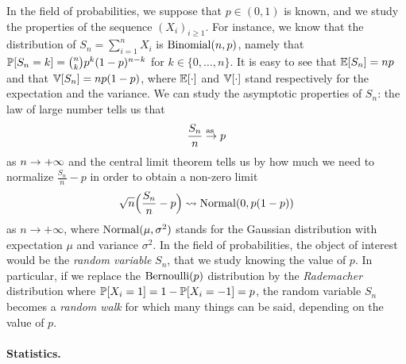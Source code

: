 In the field of probabilities, we suppose that $p \in (0, 1)$ is known, and we study the properties of the sequence $(X_i)_{i \geq 1}$. 
For instance, we know that the distribution of $S_n = \sum_{i=1}^n X_i$ is $\bin(n, p)$,  
namely that $\P[S_n = k] = \binom{n}{k} p^k (1 - p)^{n-k}$ for $k \in \{0, \ldots, n\}$.%
It is easy to see that $\E[S_n] = n p$ and that $\var[S_n] = np (1 - p)$, where $\E[\cdot]$ and $\var[\cdot]$ stand respectively for the expectation and the variance.%
%
We can study the asymptotic properties of $S_n$: the law of large number tells us that
\begin{equation*}
	\frac{S_n}{n} \goas p
\end{equation*}
as $n \go +\infty$ and the central limit theorem tells us by how much we need to normalize $\frac{S_n}{n} - p$ in order to obtain a non-zero limit
\begin{equation*}
	\sqrt n \Big(\frac{S_n}{n} - p\Big) \leadsto \nor(0, p(1-p))
\end{equation*}
as $n \rightarrow +\infty$,%
where $\nor(\mu, \sigma^2)$ stands for the Gaussian distribution with expectation $\mu$ and variance $\sigma^2$.
In the field of probabilities, the object of interest would be the \emph{random variable} $S_n$, that we study knowing the value of $p$.
In particular, if we replace the $\ber(p)$ distribution by the \emph{Rademacher} distribution where $\P[X_i = 1] = 1 - \P[X_i = -1] = p$, the random variable $S_n$ becomes a \emph{random walk} for which many things can be said, depending on the value of $p$.%

\paragraph{Statistics.} %


